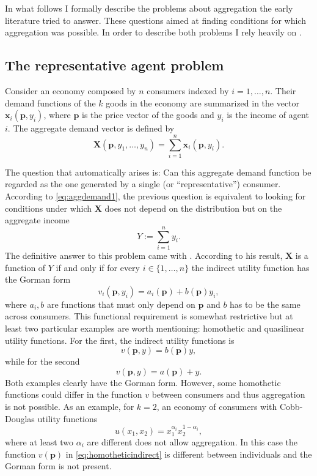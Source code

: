 \documentclass[english, a4paper, 12pt]{article}
\begin{document}
In what follows I formally describe the problems about aggregation the early literature tried to answer. These questions aimed at finding conditions for which aggregation was possible. In order to describe both problems I rely heavily on \cite{VarianBook}.

\subsection{The representative agent problem} \label{ssec:RepAgent}
Consider an economy composed by $n$ consumers indexed by $i = 1, \ldots, n$. Their demand functions of the $k$ goods in the economy are summarized in the vector $\mathbf{x}_{i}(\mathbf{p}, y_{i})$, where $\mathbf{p}$ is the price vector of the goods and $y_{i}$ is the income of agent $i$. The aggregate demand vector is defined by
	\begin{equation} \label{eq:aggdemand1}
		\mathbf{X}(\mathbf{p}, y_{1}, \ldots, y_{n}) = \sum_{i=1}^{n} \mathbf{x}_{i}(\mathbf{p},y_{i}).
	\end{equation}

The question that automatically arises is: Can this aggregate demand function be regarded as the one generated by a single (or ``representative'') consumer. According to \eqref{eq:aggdemand1}, the previous question is equivalent to looking for conditions under which $\mathbf{X}$ does not depend on the distribution but on the aggregate income
	$$Y := \sum_{i=1}^{n} y_{i}.$$
The definitive answer to this problem came with \cite{Gorman53}. According to his result, $\mathbf{X}$ is a function of $Y$ if and only if for every $i \in \{1,\ldots,n\}$ the indirect utility function has the Gorman form
	$$v_{i}(\mathbf{p}, y_{i}) = a_{i}(\mathbf{p}) + b(\mathbf{p})y_{i},$$ 
where $a_{i}, b$ are functions that must only depend on $\mathbf{p}$ and $b$ has to be the same across consumers. This functional requirement is somewhat restrictive but at least two particular examples are worth mentioning: homothetic and quasilinear utility functions. For the first, the indirect utility functions is
	\begin{equation} \label{eq:homotheticindirect}
		v(\mathbf{p}, y) = b(\mathbf{p})y,
	\end{equation}
while for the second
	$$v(\mathbf{p}, y) = a(\mathbf{p}) + y.$$
Both examples clearly have the Gorman form. However, some homothetic functions could differ in the function $v$ between consumers and thus aggregation is not possible. As an example, for $k = 2$, an economy of consumers with Cobb-Douglas utility functions
	$$u(x_{1}, x_{2}) = x_{1}^{\alpha_{i}}x_{2}^{1-\alpha_{i}},$$
where at least two $\alpha_{i}$ are different does not allow aggregation. In this case the function $v(\mathbf{p})$ in \eqref{eq:homotheticindirect} is different between individuals and the Gorman form is not present.
\end{document}
